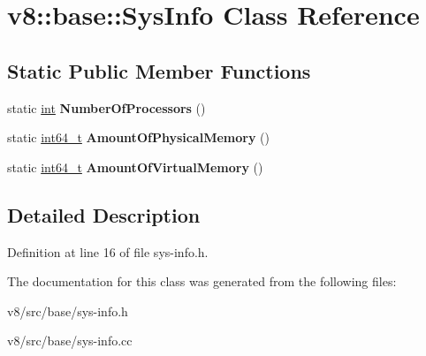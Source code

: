 \hypertarget{classv8_1_1base_1_1SysInfo}{}\section{v8\+:\+:base\+:\+:Sys\+Info Class Reference}
\label{classv8_1_1base_1_1SysInfo}
\subsection*{Static Public Member Functions}
\begin{DoxyCompactItemize}
\item 
\mbox{\label{classv8_1_1base_1_1SysInfo_a2b76071a9327082114103db3a2717630}} 
static \mbox{\hyperlink{classint}{int}} {\bfseries Number\+Of\+Processors} ()
\item 
\mbox{\label{classv8_1_1base_1_1SysInfo_a97f971a5174d8cb9ec1bc9b42b77a893}} 
static \mbox{\hyperlink{classint64__t}{int64\+\_\+t}} {\bfseries Amount\+Of\+Physical\+Memory} ()
\item 
\mbox{\label{classv8_1_1base_1_1SysInfo_af9f658e742009f9c9205088afb6d5c18}} 
static \mbox{\hyperlink{classint64__t}{int64\+\_\+t}} {\bfseries Amount\+Of\+Virtual\+Memory} ()
\end{DoxyCompactItemize}


\subsection{Detailed Description}


Definition at line 16 of file sys-\/info.\+h.



The documentation for this class was generated from the following files\+:\begin{DoxyCompactItemize}
\item 
v8/src/base/sys-\/info.\+h\item 
v8/src/base/sys-\/info.\+cc\end{DoxyCompactItemize}
